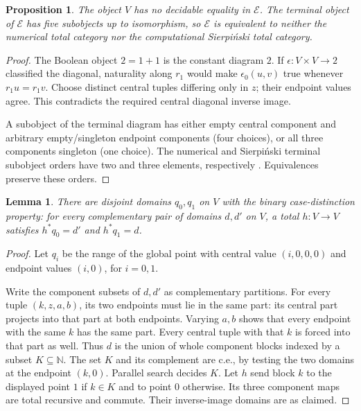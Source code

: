 \documentclass[11pt]{article}
\newtheorem{proposition}[theorem]{Proposition}
\newtheorem{lemma}[theorem]{Lemma}
\newcommand{\N}{\mathbb N}
\newcommand{\E}{\mathscr E}
\begin{document}
\begin{proposition}\label{prop:distinction}
The object $V$ has no decidable equality in $\E$.
The terminal object of $\E$ has five subobjects up to isomorphism,
so $\E$ is equivalent to neither the numerical total category
nor the computational Sierpi\'nski total category.
\end{proposition}
\begin{proof}
The Boolean object $2=1+1$ is the constant diagram $2$.
If $\epsilon:V\times V\to2$ classified the diagonal, naturality
along $r_1$ would make $\epsilon_0(u,v)$ true whenever
$r_1u=r_1v$. Choose distinct central tuples differing only in
$z$; their endpoint values agree. This contradicts the required
central diagonal inverse image.

A subobject of the terminal diagram has either empty central
component and arbitrary empty/singleton endpoint components
(four choices), or all three components singleton (one choice).
The numerical and Sierpi\'nski terminal subobject orders have
two and three elements, respectively \cite[\S6]{Iteration}.
Equivalences preserve these orders.
\end{proof}

\begin{lemma}\label{lem:case}
There are disjoint domains $q_0,q_1$ on $V$ with the binary
case-distinction property: for every complementary pair of
domains $d,d'$ on $V$, a total $h:V\to V$ satisfies
$h^*q_0=d'$ and $h^*q_1=d$.
\end{lemma}
\begin{proof}
Let $q_i$ be the range of the global point with central value
$(i,0,0,0)$ and endpoint values $(i,0)$, for $i=0,1$.

Write the component subsets of $d,d'$ as complementary partitions.
For every tuple $(k,z,a,b)$, its two endpoints must lie in the
same part: its central part projects into that part at both
endpoints. Varying $a,b$ shows that every endpoint with the
same $k$ has the same part. Every central tuple with that $k$
is forced into that part as well. Thus $d$ is the union of
whole component blocks indexed by a subset $K\subseteq\N$.
The set $K$ and its complement are c.e., by testing the two
domains at the endpoint $(k,0)$. Parallel search decides $K$.
Let $h$ send block $k$ to the displayed point $1$ if $k\in K$
and to point $0$ otherwise. Its three component maps are total
recursive and commute. Their inverse-image domains are as claimed.
\end{proof}
\end{document}
